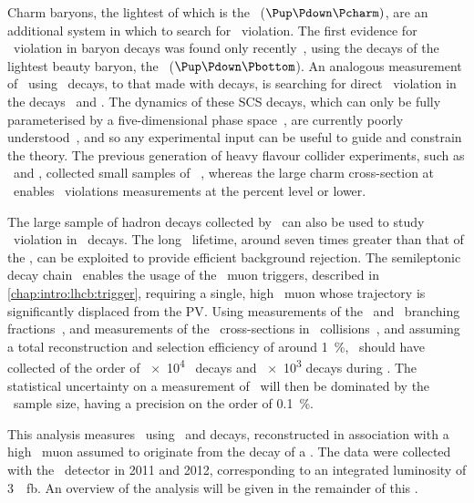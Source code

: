
Charm baryons, the lightest of which is the \PLambdac~($\Pup\Pdown\Pcharm)$, 
are an additional system in which to search for \CP\ violation.
The first evidence for \CP\ violation in baryon decays was found only 
recently~\cite{Aaij:2016cla}, using the decays of the lightest beauty baryon, 
the \PLambdab~($\Pup\Pdown\Pbottom$).
An analogous measurement of \dACP\ using \PLambdac\ decays, to that made with 
\PDzero decays, is searching for direct \CP\ violation in the decays \LcTopKK\ 
and \LcToppipi.
The dynamics of these \ac{SCS} decays, which can only be fully parameterised by 
a five-dimensional phase space~\cite{Aitala:1999uq}, are currently poorly 
understood~\cite{Bigi:2012ev,PDG2014}, and so any experimental input can be 
useful to guide and constrain the theory.
The previous generation of heavy flavour collider experiments, such as \belle\ 
and \babar, collected small samples of \PLambdac~\cite{Seuster:2005tr}, whereas 
the large charm cross-section at \lhcb\ enables \CP\ violations measurements at 
the percent level or lower.

The large sample of \Pbottom hadron decays collected by \lhcb\ can also be used 
to study \CP\ violation in \PLambdac\ decays.
The long \PLambdab\ lifetime, around seven times greater than that of the 
\PLambdac, can be exploited to provide efficient background rejection.
The semileptonic decay chain \LbToLcmuX\ enables the usage of the \lhcb\ muon 
triggers, described in \cref{chap:intro:lhcb:trigger}, requiring a single, high 
\pT\ muon whose trajectory is significantly displaced from the \ac{PV}.
Using measurements of the \LbToLcmuX\ and \LcTophh\ branching 
fractions~\cite{PDG2014,Ablikim:2016tze}, and measurements of the \PLambdab\ 
cross-sections in \pp\ collisions~\cite{Aaij:2015fea}, and assuming a total 
reconstruction and selection efficiency of around \SI{1}{\percent}, \lhcb\ 
should have collected of the order of \num{e4} \ppipi\ decays and \num{e3} \pKK 
decays during \runone.
The statistical uncertainty on a measurement of \dACP\ will then be dominated 
by the \pKK\ sample size, having a precision on the order of 
\SI{0.1}{\percent}.

This analysis measures \dACP\ using \LcTopKK\ and \LcToppipi decays, 
reconstructed in association with a high \pT\ muon assumed to originate from 
the decay of a \PLambdab.
The data were collected with the \lhcb\ detector in 2011 and 2012, 
corresponding to an integrated luminosity of \SI{3}{\per\femto\barn}.
An overview of the analysis will be given in the remainder of this 
.

